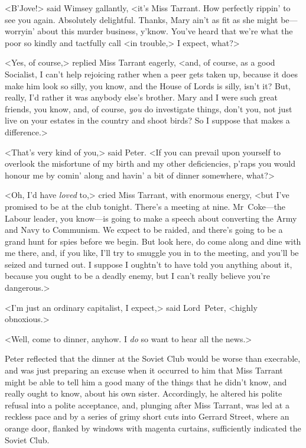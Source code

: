 <B'Jove!> said Wimsey gallantly, <it's Miss Tarrant. How perfectly rippin' to see you again. Absolutely delightful. Thanks, Mary ain't as fit as she might be—worryin' about this murder business, y'know.  You've heard that we're what the poor so kindly and tactfully call <in trouble,> I expect, what?>

<Yes, of course,> replied Miss Tarrant eagerly, <and, of course, as a good Socialist, I can't help rejoicing rather when a peer gets taken up, because it does make him look so silly, you know, and the House of Lords is silly, isn't it? But, really, I'd rather it was anybody else's brother. Mary and I were such great friends, you know, and, of course, \emph{you} do investigate things, don't you, not just live on your estates in the country and shoot birds? So I suppose that makes a difference.>

<That's very kind of you,> said Peter. <If you can prevail upon yourself to overlook the misfortune of my birth and my other deficiencies, p'raps you would honour me by comin' along and havin' a bit of dinner somewhere, what?>

<Oh, I'd have \emph{loved} to,> cried Miss Tarrant, with enormous energy, <but I've promised to be at the club tonight. There's a meeting at nine. Mr~Coke—the Labour leader, you know—is going to make a speech about converting the Army and Navy to Communism. We expect to be raided, and there's going to be a grand hunt for spies before we begin.  But look here, do come along and dine with me there, and, if you like, I'll try to smuggle you in to the meeting, and you'll be seized and turned out. I suppose I oughtn't to have told you anything about it, because you ought to be a deadly enemy, but I can't really believe you're dangerous.>

<I'm just an ordinary capitalist, I expect,> said Lord~Peter, <highly obnoxious.>

<Well, come to dinner, anyhow. I \emph{do} so want to hear all the news.>

Peter reflected that the dinner at the Soviet Club would be worse than execrable, and was just preparing an excuse when it occurred to him that Miss Tarrant might be able to tell him a good many of the things that he didn't know, and really ought to know, about his own sister.  Accordingly, he altered his polite refusal into a polite acceptance, and, plunging after Miss Tarrant, was led at a reckless pace and by a series of grimy short cuts into Gerrard Street, where an orange door, flanked by windows with magenta curtains, sufficiently indicated the Soviet Club.

